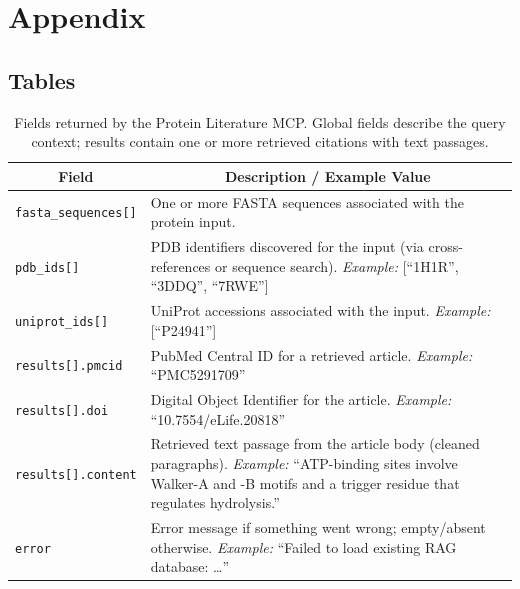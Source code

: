 \documentclass{article}
\begin{document}




\clearpage
\appendix


\section{Appendix}
\subsection{Tables}
\begin{table}[!htbp]
\caption{Fields returned by the Protein Literature MCP. Global fields describe the query context; results contain one or more retrieved citations with text passages.}
\label{tab:literature-mcp}
\begin{center}
\begin{tabular}{p{3.7cm}p{10cm}}
\toprule
\multicolumn{1}{c}{\bf Field} & \multicolumn{1}{c}{\bf Description / Example Value} \\
\midrule
\texttt{fasta\_sequences[]} & One or more FASTA sequences associated with the protein input. \\
\addlinespace
\texttt{pdb\_ids[]} & PDB identifiers discovered for the input (via cross-references or sequence search). \emph{Example:} [“1H1R”, “3DDQ”, “7RWE”] \\
\addlinespace
\texttt{uniprot\_ids[]} & UniProt accessions associated with the input. \emph{Example:} [“P24941”] \\
\addlinespace
\texttt{results[].pmcid} & PubMed Central ID for a retrieved article. \emph{Example:} “PMC5291709” \\
\addlinespace
\texttt{results[].doi} & Digital Object Identifier for the article. \emph{Example:} “10.7554/eLife.20818” \\
\addlinespace
\texttt{results[].content} & Retrieved text passage from the article body (cleaned paragraphs). \emph{Example:} “ATP-binding sites involve Walker-A and -B motifs and a trigger residue that regulates hydrolysis.” \\
\addlinespace
\texttt{error} & Error message if something went wrong; empty/absent otherwise. \emph{Example:} “Failed to load existing RAG database: …” \\
\bottomrule
\end{tabular}
\end{center}
\end{table}
\end{document}
